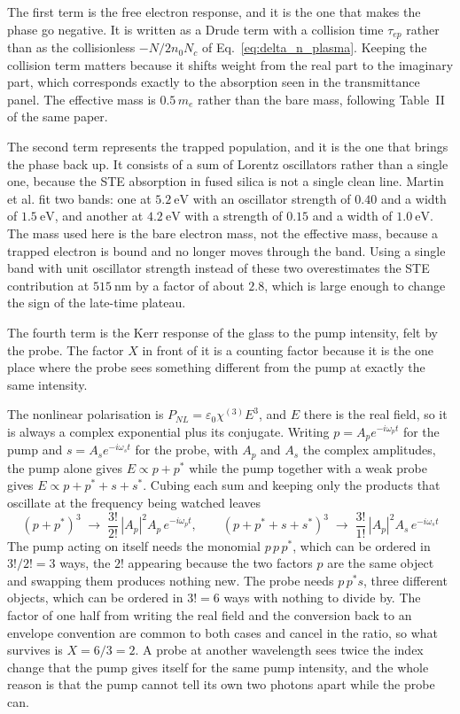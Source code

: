 The first term is the free electron response, and it is the one that makes the phase go negative. It is written as a Drude term with a collision time $\tau_{ep}$ rather than as the collisionless $-N/2n_0N_c$ of Eq.~\eqref{eq:delta_n_plasma}. Keeping the collision term matters because it shifts weight from the real part to the imaginary part, which corresponds exactly to the absorption seen in the transmittance panel. The effective mass is $0.5\,m_e$ rather than the bare mass, following Table~II of the same paper.

The second term represents the trapped population, and it is the one that brings the phase back up. It consists of a sum of Lorentz oscillators rather than a single one, because the STE absorption in fused silica is not a single clean line. Martin et al. fit two bands: one at $5.2\ \text{eV}$ with an oscillator strength of $0.40$ and a width of $1.5\ \text{eV}$, and another at $4.2\ \text{eV}$ with a strength of $0.15$ and a width of $1.0\ \text{eV}$. The mass used here is the bare electron mass, not the effective mass, because a trapped electron is bound and no longer moves through the band. Using a single band with unit oscillator strength instead of these two overestimates the STE contribution at $515\ \text{nm}$ by a factor of about $2.8$, which is large enough to change the sign of the late-time plateau.

The fourth term is the Kerr response of the glass to the pump intensity, felt by the probe. The factor $X$ in front of it is a counting factor because it is the one place where the probe sees something different from the pump at exactly the same intensity.

The nonlinear polarisation is $P_{NL}=\varepsilon_0\chi^{(3)}E^{3}$, and $E$ there is the real field, so it is always a complex exponential plus its conjugate. Writing $p=A_p e^{-i\omega_p t}$ for the pump and $s=A_s e^{-i\omega_s t}$ for the probe, with $A_p$ and $A_s$ the complex amplitudes, the pump alone gives $E\propto p+p^{*}$ while the pump together with a weak probe gives $E\propto p+p^{*}+s+s^{*}$. Cubing each sum and keeping only the products that oscillate at the frequency being watched leaves
\begin{equation}
\label{eq:xpm_counting}
(p+p^{*})^{3} \;\longrightarrow\; \frac{3!}{2!}\,|A_p|^{2}A_p\,e^{-i\omega_p t},
\qquad
(p+p^{*}+s+s^{*})^{3} \;\longrightarrow\; \frac{3!}{1!}\,|A_p|^{2}A_s\,e^{-i\omega_s t}
\end{equation}
The pump acting on itself needs the monomial $p\,p\,p^{*}$, which can be
ordered in $3!/2!=3$ ways, the $2!$ appearing because the two factors $p$ are
the same object and swapping them produces nothing new. The probe needs
$p\,p^{*}s$, three different objects, which can be ordered in $3!=6$ ways with
nothing to divide by. The factor of one half from writing the real field and
the conversion back to an envelope convention are common to both cases and
cancel in the ratio, so what survives is $X=6/3=2$. A probe at another
wavelength sees twice the index change that the pump gives itself for the same
pump intensity, and the whole reason is that the pump cannot tell its own two
photons apart while the probe can.

